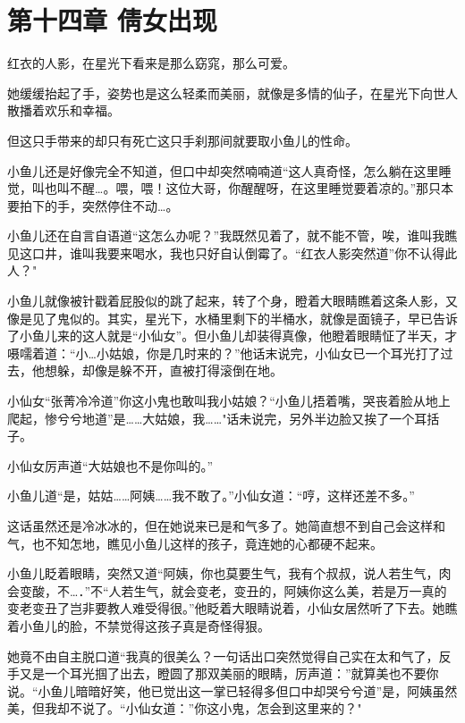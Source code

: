 \documentclass[12pt,oneside]{book}
\begin{document}
\hypertarget{ux7b2cux5341ux56dbux7ae0-ux5029ux5973ux51faux73b0}{%
\chapter{第十四章
倩女出现}\label{ux7b2cux5341ux56dbux7ae0-ux5029ux5973ux51faux73b0}}

红衣的人影，在星光下看来是那么窈窕，那么可爱。

她缓缓抬起了手，姿势也是这么轻柔而美丽，就像是多情的仙子，在星光下向世人散播着欢乐和幸福。

但这只手带来的却只有死亡这只手刹那间就要取小鱼儿的性命。

小鱼儿还是好像完全不知道，但口中却突然喃喃道``这人真奇怪，怎么躺在这里睡觉，叫也叫不醒\ldots。喂，喂！这位大哥，你醒醒呀，在这里睡觉要着凉的。''那只本要拍下的手，突然停住不动\ldots。

小鱼儿还在自言自语道``这怎么办呢？''我既然见着了，就不能不管，唉，谁叫我瞧见这口井，谁叫我要来喝水，我也只好自认倒霉了。``红衣人影突然道''你不认得此人？"

小鱼儿就像被针戳着屁股似的跳了起来，转了个身，瞪着大眼睛瞧着这条人影，又像是见了鬼似的。其实，星光下，水桶里剩下的半桶水，就像是面镜子，早已告诉了小鱼儿来的这人就是``小仙女''。但小鱼儿却装得真像，他瞪着眼睛怔了半天，才嗫嚅着道：``小\ldots 小姑娘，你是几时来的？''他话末说完，小仙女已一个耳光打了过去，他想躲，却像是躲不开，直被打得滚倒在地。

小仙女``张菁冷冷道''你这小鬼也敢叫我小姑娘？``小鱼儿捂着嘴，哭丧着脸从地上爬起，惨兮兮地道''是\ldots\ldots 大姑娘，我\ldots\ldots"话未说完，另外半边脸又挨了一个耳括子。

小仙女厉声道``大姑娘也不是你叫的。''

小鱼儿道``是，姑姑\ldots\ldots 阿姨\ldots\ldots 我不敢了。''小仙女道：``哼，这样还差不多。''

这话虽然还是冷冰冰的，但在她说来已是和气多了。她简直想不到自己会这样和气，也不知怎地，瞧见小鱼儿这样的孩子，竟连她的心都硬不起来。

小鱼儿眨着眼睛，突然又道``阿姨，你也莫要生气，我有个叔叔，说人若生气，肉会变酸，不\ldots．''不``人若生气，就会变老，变丑的，阿姨你这么美，若是万一真的变老变丑了岂非要教人难受得很。''他眨着大眼睛说着，小仙女居然听了下去。她瞧着小鱼儿的脸，不禁觉得这孩子真是奇怪得狠。

她竟不由自主脱口道``我真的很美么？一句话出口突然觉得自己实在太和气了，反手又是一个耳光掴了出去，瞪圆了那双美丽的眼睛，厉声道：''就算美也不要你说。``小鱼儿暗暗好笑，他已觉出这一掌已轻得多但口中却哭兮兮道''是，阿姨虽然美，但我却不说了。``小仙女道：''你这小鬼，怎会到这里来的？"
\end{document}
